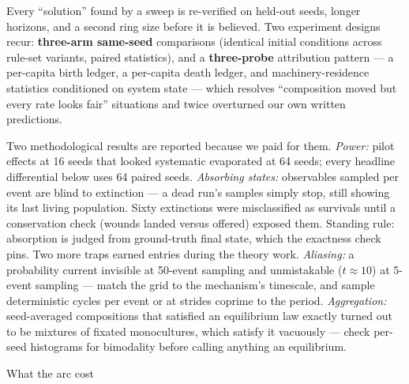 Every “solution” found by a sweep is re-verified on held-out
seeds, longer horizons, and a second ring size before it is
believed. Two experiment designs recur: {\bf three-arm same-seed}
comparisons (identical initial conditions across rule-set variants,
paired statistics), and a {\bf three-probe} attribution pattern ---
a per-capita birth ledger, a per-capita death ledger, and
machinery-residence statistics conditioned on system state ---
which resolves “composition moved but every rate looks fair”
situations and twice overturned our own written predictions.

Two methodological results are reported because we paid for them.
{\it Power:} pilot effects at 16 seeds that looked systematic
evaporated at 64 seeds; every headline differential below uses 64
paired seeds. {\it Absorbing states:} observables sampled per event
are blind to extinction --- a dead run's samples simply stop, still
showing its last living population. Sixty extinctions were
misclassified as survivals until a conservation check (wounds
landed versus offered) exposed them. Standing rule: absorption is
judged from ground-truth final state, which the exactness check
pins. Two more traps earned entries during the theory work.
{\it Aliasing:} a probability current invisible at 50-event
sampling and unmistakable ($t\approx10$) at 5-event sampling ---
match the grid to the mechanism's timescale, and sample
deterministic cycles per event or at strides coprime to the
period. {\it Aggregation:} seed-averaged compositions that
satisfied an equilibrium law exactly turned out to be mixtures of
fixated monocultures, which satisfy it vacuously --- check
per-seed histograms for bimodality before calling anything an
equilibrium.

\secc What the arc cost

\medskip
\noindent{}
\medskip

